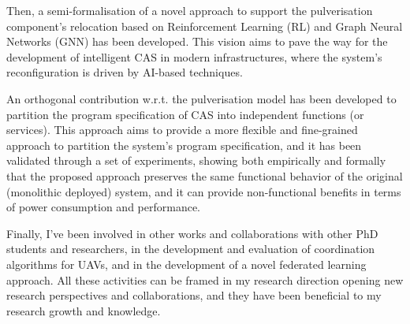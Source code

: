 \documentclass[runningheads]{llncs}
\begin{document}
Then,
a semi-formalisation of a novel approach to support the pulverisation component's relocation based on Reinforcement Learning (RL) and Graph Neural Networks (GNN) has been developed.
%
This vision aims to pave the way for the development of intelligent CAS in modern infrastructures,
where the system's reconfiguration is driven by AI-based techniques.

An orthogonal contribution w.r.t. the pulverisation model has been developed to partition the program specification of CAS into independent functions (or services).
%
This approach aims to provide a more flexible and fine-grained approach to partition the system's program specification,
and it has been validated through a set of experiments,
showing both empirically and formally that the proposed approach preserves the same functional behavior of the original (monolithic deployed) system,
and it can provide non-functional benefits in terms of power consumption and performance.

Finally,
I've been involved in other works and collaborations with other PhD students and researchers,
in the development and evaluation of coordination algorithms for UAVs,
and in the development of a novel federated learning approach.
%
All these activities can be framed in my research direction opening new research perspectives and collaborations,
and they have been beneficial to my research growth and knowledge.



\end{document}
